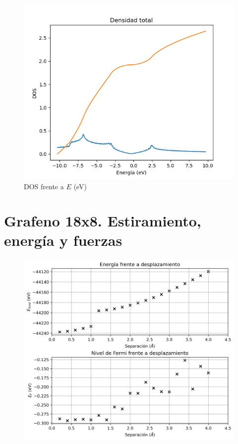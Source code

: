 \begin{figure}[!t]
    \centering
    \includegraphics[scale=.6]{FIGURAS/Densidad_total.png}
    \caption{DOS frente a $E$ (eV)}
    \label{fig:enter-label3}
\end{figure}
\clearpage 
\section{Grafeno 18x8. Estiramiento, energía y fuerzas}


\begin{figure}[!h]
    \centering
    \includegraphics[scale = .9]{FIGURAS/E_F_desp_graf_18x8.png}
    \label{fig:18x8_e_ef}
\end{figure}

